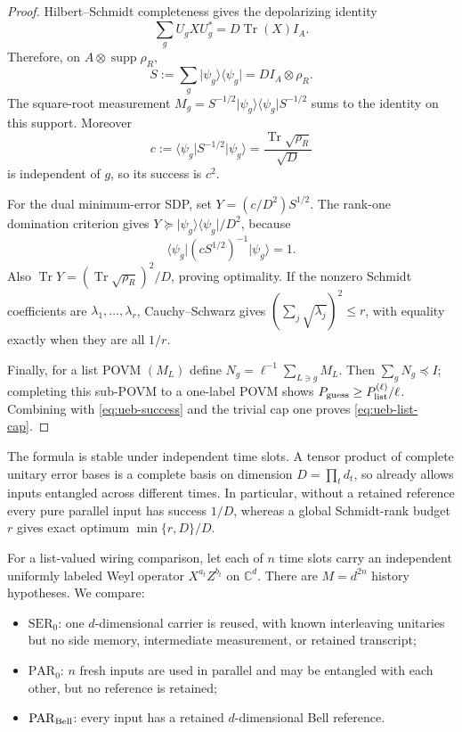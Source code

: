 \documentclass[11pt]{article}
\theoremstyle{definition}
\theoremstyle{remark}
\newcommand{\C}{\mathbb C}
\newcommand{\supp}{\operatorname{supp}}
\newcommand{\Tr}{\operatorname{Tr}}
\newcommand{\ket}[1]{\lvert #1\rangle}
\newcommand{\bra}[1]{\langle #1\rvert}
\begin{document}
\begin{proof}
Hilbert--Schmidt completeness gives the depolarizing identity
\[
 \sum_gU_g XU_g^*=D\Tr(X)I_A.
\]
Therefore, on $A\otimes\supp\rho_R$,
\begin{equation}\label{eq:ueb-frame}
 S:=\sum_g\ket{\psi_g}\!\bra{\psi_g}
   =D I_A\otimes\rho_R.
\end{equation}
The square-root measurement
$M_g=S^{-1/2}\ket{\psi_g}\!\bra{\psi_g}S^{-1/2}$ sums to the identity on
this support.  Moreover
\[
 c:=\bra{\psi_g}S^{-1/2}\ket{\psi_g}
   =\frac{\Tr\sqrt{\rho_R}}{\sqrt D}
\]
is independent of $g$, so its success is $c^2$.

For the dual minimum-error SDP, set
$Y=(c/D^2)S^{1/2}$.  The rank-one domination criterion gives
$Y\succeq\ket{\psi_g}\!\bra{\psi_g}/D^2$, because
\[
 \bra{\psi_g}(cS^{1/2})^{-1}\ket{\psi_g}=1.
\]
Also $\Tr Y=(\Tr\sqrt{\rho_R})^2/D$, proving optimality.  If the nonzero
Schmidt coefficients are $\lambda_1,\ldots,\lambda_r$, Cauchy--Schwarz gives
$(\sum_j\sqrt{\lambda_j})^2\leq r$, with equality exactly when they are
all $1/r$.

Finally, for a list POVM $(M_L)$ define
$N_g=\ell^{-1}\sum_{L\ni g}M_L$.  Then
$\sum_gN_g\preceq I$; completing this sub-POVM to a one-label POVM shows
$P_{\rm guess}\geq P_{\rm list}^{(\ell)}/\ell$.  Combining with
\eqref{eq:ueb-success} and the trivial cap one proves
\eqref{eq:ueb-list-cap}.
\end{proof}

The formula is stable under independent time slots.  A tensor product of
complete unitary error bases is a complete basis on dimension
$D=\prod_td_t$, so  already allows inputs entangled
across different times.  In particular, without a retained reference every
pure parallel input has success $1/D$, whereas a global Schmidt-rank budget
$r$ gives exact optimum $\min\{r,D\}/D$.

For a list-valued wiring comparison, let each of $n$ time slots carry an
independent uniformly labeled Weyl operator $X^{a_t}Z^{b_t}$ on $\C^d$.
There are $M=d^{2n}$ history hypotheses.  We compare:
\begin{itemize}
 \item $\mathrm{SER}_0$: one $d$-dimensional carrier is reused, with known
       interleaving unitaries but no side memory, intermediate measurement,
       or retained transcript;
 \item $\mathrm{PAR}_0$: $n$ fresh inputs are used in parallel and may be
       entangled with each other, but no reference is retained;
 \item $\mathrm{PAR}_{\rm Bell}$: every input has a retained
       $d$-dimensional Bell reference.
\end{itemize}
\end{document}

